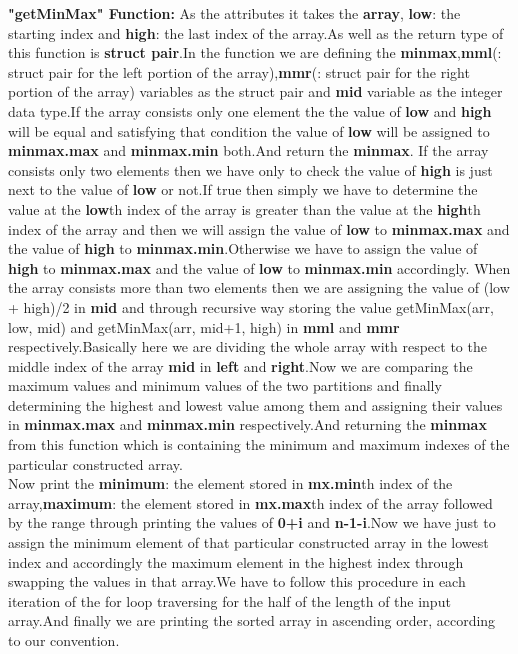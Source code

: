 \documentclass[conference]{IEEEtran}
\begin{document}
\textbf{"getMinMax" Function:} As the attributes it takes the \textbf{array}, \textbf{low}: the starting index and \textbf{high}: the last index of the array.As well as the return type of this function is \textbf{struct pair}.In the function we are defining the \textbf{minmax},\textbf{mml}(: struct pair for the left portion of the array),\textbf{mmr}(: struct pair for the right portion of the array) variables as the struct pair and \textbf{mid} variable as the integer data type.If the array consists only one element the the value of \textbf{low} and \textbf{high} will be equal and satisfying that condition the value of \textbf{low} will be assigned to \textbf{minmax.max} and \textbf{minmax.min} both.And return the \textbf{minmax}. If the array consists only two elements then we have only to check the value of \textbf{high} is just next to the value of \textbf{low} or not.If true then simply we have to determine the value at the \textbf{low}th index of the array is greater than the value at the \textbf{high}th index of the array and then we will assign the value of \textbf{low} to \textbf{minmax.max} and the value of \textbf{high} to \textbf{minmax.min}.Otherwise we have to assign the value of \textbf{high} to \textbf{minmax.max} and the value of \textbf{low} to \textbf{minmax.min} accordingly.
When the array consists more than two elements then we are assigning the value of (low + high)/2 in \textbf{mid} and through recursive way storing the value getMinMax(arr, low, mid) and getMinMax(arr, mid+1, high) in \textbf{mml} and \textbf{mmr} respectively.Basically here we are dividing the whole array with respect to the middle index of the array \textbf{mid} in \textbf{left} and \textbf{right}.Now we are comparing the maximum values and minimum values of the two partitions and finally determining the highest and lowest value among them and assigning their values in \textbf{minmax.max} and \textbf{minmax.min} respectively.And returning the \textbf{minmax} from this function which is containing the minimum and maximum indexes of the particular constructed array.\\

Now print the \textbf{minimum}: the element stored in \textbf{mx.min}th index of the array,\textbf{maximum}: the element stored in \textbf{mx.max}th index of the array followed by the range through printing the values of \textbf{0+i} and \textbf{n-1-i}.Now we have just to assign the minimum element of that particular constructed array in the lowest index and accordingly the maximum element in the highest index through swapping the values in that array.We have to follow this procedure in each iteration of the for loop traversing for the half of the length of the input array.And finally we are printing the sorted array in ascending order, according to our convention.\\
\end{document}
